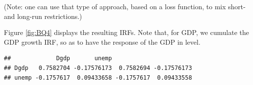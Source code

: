 \documentclass[
  12pt,
]{book}
\newenvironment{Shaded}{\begin{snugshade}}{\end{snugshade}}
\newcommand{\DecValTok}[1]{\textcolor[rgb]{0.00,0.00,0.81}{#1}}
\newcommand{\FunctionTok}[1]{\textcolor[rgb]{0.00,0.00,0.00}{#1}}
\newcommand{\NormalTok}[1]{#1}
\newcommand{\OtherTok}[1]{\textcolor[rgb]{0.56,0.35,0.01}{#1}}
\newcommand{\SpecialCharTok}[1]{\textcolor[rgb]{0.00,0.00,0.00}{#1}}
\theoremstyle{definition}
\theoremstyle{definition}
\theoremstyle{definition}
\theoremstyle{definition}
\theoremstyle{remark}
\begin{document}
(Note: one can use that type of approach, based on a loss function, to mix short- and long-run restrictions.)

Figure \ref{fig:BQ4} displays the resulting IRFs. Note that, for GDP, we cumulate the GDP growth IRF, so as to have the response of the GDP in level.

\begin{Shaded}
\end{Shaded}

\begin{verbatim}
##             Dgdp       unemp                       
## Dgdp   0.7582704 -0.17576173  0.7582694 -0.17576173
## unemp -0.1757617  0.09433658 -0.1757617  0.09433558
\end{verbatim}
\end{document}
